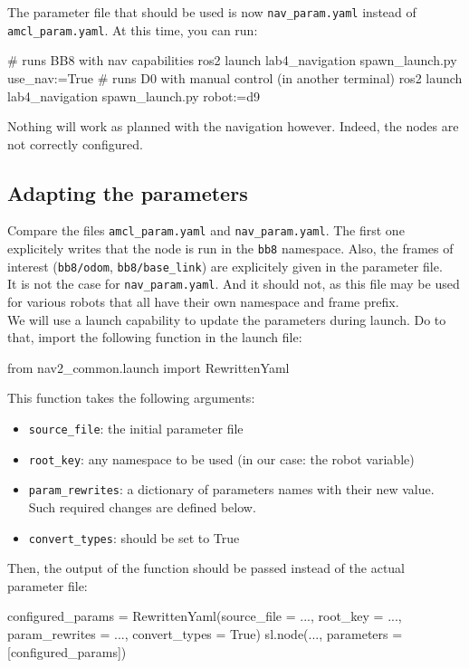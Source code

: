 \documentclass{ecnreport}
\begin{document}
The parameter file that should be used is now \texttt{nav\_param.yaml} instead of \texttt{amcl\_param.yaml}. At this time, you can run:
\begin{bashcodelarge}
# runs BB8 with nav capabilities
ros2 launch lab4_navigation spawn_launch.py use_nav:=True
# runs D0 with manual control (in another terminal)
ros2 launch lab4_navigation spawn_launch.py robot:=d9 
 \end{bashcodelarge}
 Nothing will work as planned with the navigation however. Indeed, the nodes are not correctly configured.

\subsection{Adapting the parameters}

Compare the files \texttt{amcl\_param.yaml} and \texttt{nav\_param.yaml}. The first one explicitely writes that the node is run in the \texttt{bb8} namespace. Also, the frames of interest (\texttt{bb8/odom}, \texttt{bb8/base\_link}) are explicitely given in the parameter file.\\

It is not the case for \texttt{nav\_param.yaml}. And it should not, as this file may be used for various robots that all have their own namespace and frame prefix.\\
We will use a launch capability to update the parameters during launch. Do to that, import the following function in the launch file:
\begin{pythoncodelarge}
from nav2_common.launch import RewrittenYaml
\end{pythoncodelarge}

This function takes the following arguments:
\begin{itemize}
\item \texttt{source\_file}: the initial parameter file
\item \texttt{root\_key}: any namespace to be used (in our case: the robot variable)
\item \texttt{param\_rewrites}: a dictionary of parameters names with their new value. Such required changes are defined below.
\item \texttt{convert\_types}: should be set to True
\end{itemize}

Then, the output of the function should be passed instead of the actual parameter file:
\begin{pythoncodelarge}
configured_params = RewrittenYaml(source_file = ...,
                                    root_key = ..., 
                                    param_rewrites = ...,
                                    convert_types = True)
sl.node(..., parameters = [configured_params])
\end{pythoncodelarge}
\end{document}
